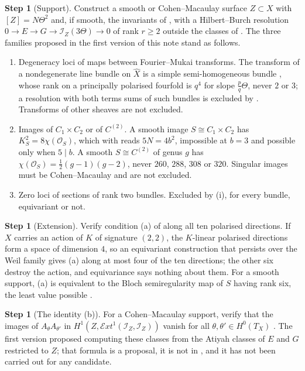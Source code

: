\documentclass[11pt]{amsart}
\theoremstyle{definition}
\newtheorem{step}[theorem]{Step}
\theoremstyle{remark}
\newcommand{\cO}{\mathcal{O}}
\newcommand{\cI}{\mathcal{I}}
\newcommand{\cExt}{\mathcal{E}xt}
\begin{document}
\begin{step}[Support]\label{step:support}
Construct a smooth or Cohen--Macaulay surface $Z\subset X$ with
$[Z]=N\Theta^{2}$ and, if smooth, the invariants of ,
with a Hilbert--Burch resolution $0\to E\to G\to\cI_{Z}(3\Theta)\to0$ of
rank $r\ge2$ outside the classes of . The three families
proposed in the first version of this note stand as follows.
\begin{enumerate}[label=(\arabic*),leftmargin=2.2em]
\item Degeneracy loci of maps between Fourier--Mukai transforms. The
  transform of a nondegenerate line bundle on $\widehat X$ is a simple
  semi-homogeneous bundle \cite{Muk78,Muk81}, whose rank on a principally
  polarised fourfold is $q^{4}$ for slope $\tfrac pq\Theta$, never $2$ or $3$;
  a resolution with both terms sums of such bundles is excluded by
  \cite[Theorem~18.66]{BMB}. Transforms of other sheaves are not excluded.
\item Images of $C_{1}\times C_{2}$ or of $C^{(2)}$. A smooth image
  $S\cong C_{1}\times C_{2}$ has $K_{S}^{2}=8\chi(\cO_{S})$, which with
   reads $5N=4b^{2}$, impossible at $b=3$ and possible only
  when $5\mid b$. A smooth $S\cong C^{(2)}$ of genus $g$ has
  $\chi(\cO_{S})=\tfrac12(g-1)(g-2)$, never $260$, $288$, $308$ or $320$.
  Singular images must be Cohen--Macaulay and are not excluded.
\item Zero loci of sections of rank two bundles. Excluded by
  (i), for every bundle, equivariant or not.
\end{enumerate}
\end{step}

\begin{step}[Extension]\label{step:extension}
Verify condition (a) of  along all ten polarised
directions. If $X$ carries an action of $K$ of signature $(2,2)$, the
$K$-linear polarised directions form a space of dimension $4$, so an
equivariant construction that persists over the Weil family gives (a) along
at most four of the ten directions; the other six destroy the action, and
equivariance says nothing about them. For a smooth support, (a) is
equivalent to the Bloch semiregularity map of $S$ having rank six, the least
value possible \cite[Proposition~18.46]{BMB}.
\end{step}

\begin{step}[The identity \textup{(b)}]\label{step:heisenberg}
For a Cohen--Macaulay support, verify that the images of $A_{\theta}A_{\theta'}$
in $H^{1}(Z,\cExt^{1}(\cI_{Z},\cI_{Z}))$ vanish for all
$\theta,\theta'\in H^{0}(T_{X})$ \cite[Corollary~18.50(ii)]{BMB}. The first
version proposed computing these classes from the Atiyah classes of $E$ and
$G$ restricted to $Z$; that formula is a proposal, it is not in \cite{BMB},
and it has not been carried out for any candidate.
\end{step}
\end{document}
